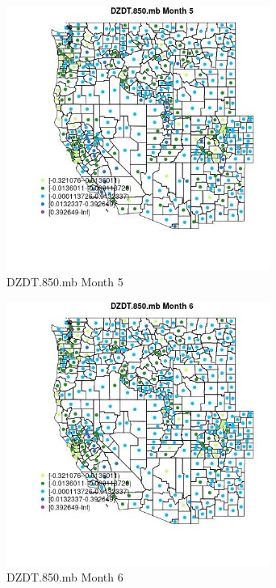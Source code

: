 \begin{figure} 
\centering  
\includegraphics[width=0.77\textwidth]{Code_Outputs/df_report_ML_predictors_CountyCentroid_Locations_Dates_2008-01-01to2018-12-31_MapObsMo5DZDT850mb.jpg} 
\caption{\label{fig:df_report_ML_predictors_CountyCentroid_Locations_Dates_2008-01-01to2018-12-31MapObsMo5DZDT850mb}DZDT.850.mb Month 5} 
\end{figure} 
 

\clearpage 

\begin{figure} 
\centering  
\includegraphics[width=0.77\textwidth]{Code_Outputs/df_report_ML_predictors_CountyCentroid_Locations_Dates_2008-01-01to2018-12-31_MapObsMo6DZDT850mb.jpg} 
\caption{\label{fig:df_report_ML_predictors_CountyCentroid_Locations_Dates_2008-01-01to2018-12-31MapObsMo6DZDT850mb}DZDT.850.mb Month 6} 
\end{figure} 
 

